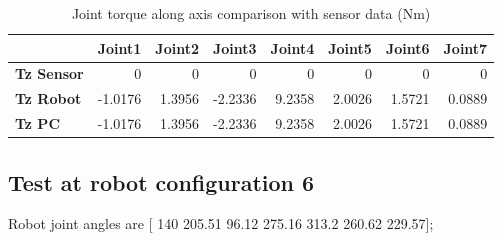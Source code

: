 \begin{table}[h!]
	\centering
	\caption{Joint torque along axis comparison with sensor data (Nm)}
	\label{wrech_Sensor_Pose5}
	\begin{tabular}{|l|r|r|r|r|r|r|r|}
		\hline
		\textbf{} & \textbf{Joint1} & \textbf{Joint2} & \textbf{Joint3} & \textbf{Joint4} & \textbf{Joint5} & \textbf{Joint6} & \textbf{Joint7} \\ \hline
		\textbf{Tz Sensor}  & 0           & 0           & 0            & 0           & 0           & 0           & 0           \\ \hline
		\textbf{Tz Robot}  	& -1.0176           & 1.3956           & -2.2336            & 9.2358           & 2.0026           & 1.5721           & 0.0889           \\ \hline
		\textbf{Tz PC}  	& -1.0176           & 1.3956           & -2.2336            & 9.2358           & 2.0026           & 1.5721           & 0.0889           \\ \hline
	\end{tabular}
\end{table}


\subsection{Test at robot configuration 6}
Robot joint angles are  [ 140        205.51         96.12        275.16         313.2        260.62        229.57];

